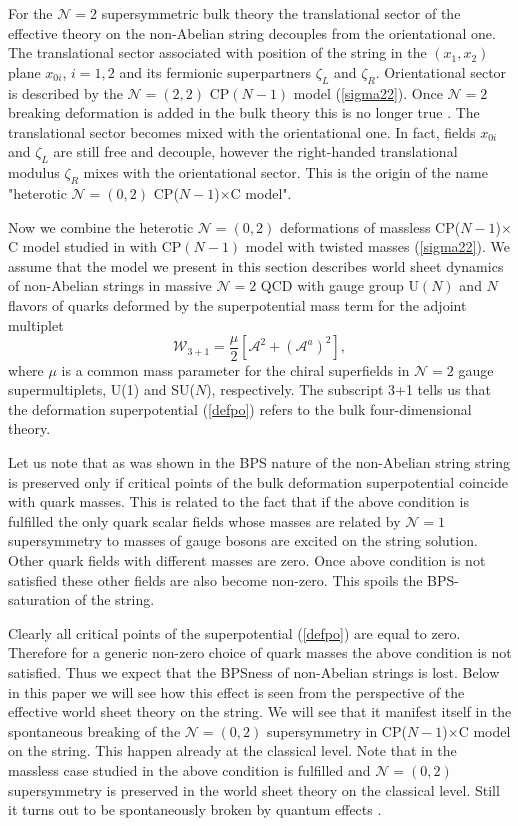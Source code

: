 \documentclass[12pt]{article}
\def\beq{\begin{equation}}
\def\eeq{\end{equation}}
\newcommand{\ntwo}{${\mathcal N}=2$ }
\newcommand{\ntwot}{${\mathcal N}= \left(2,2\right) $ }
\newcommand{\ntwoo}{${\mathcal N}= \left(0,2\right) $ }
\newcommand{\none}{${\mathcal N}=1$ }
\newcommand{\CPC}{CP($N-1$)$\times$C }
\begin{document}
For the \ntwo supersymmetric bulk theory the translational
sector of the effective theory on the non-Abelian string 
decouples from the orientational one. The translational sector
associated with position of the string in the $(x_1,x_2)$
plane $x_{0i}$, $i=1,2$ and its fermionic superpartners
$\zeta_L$ and $\zeta_R$. Orientational sector is described by the \ntwot CP$(N-1)$ model (\ref{sigma22}). Once \ntwo
breaking deformation is added in the bulk theory this is no longer true \cite{Edalati}. The translational sector becomes
mixed with the orientational one. In fact, fields $x_{0i}$ and 
$\zeta_L$ are still free and decouple, however the 
right-handed translational modulus $\zeta_R$ mixes with
the orientational sector. This is the origin of the name
"heterotic \ntwoo \CPC model".


Now we combine the heterotic \ntwoo deformations of massless
\CPC model studied in \cite{Edalati, SYhet,SYhetlN,BSYhet}
with CP$(N-1)$ model with twisted masses (\ref{sigma22}).
We assume that the model we present in this section 
describes world sheet dynamics of non-Abelian strings
in massive \ntwo QCD with gauge group U$(N)$ and $N$ flavors of quarks
deformed by the superpotential mass term for the adjoint multiplet
\beq
{\mathcal W}_{3+1}=\frac{\mu}{2} \left[{\mathcal A}^2
+  ({\mathcal A}^a)^2\right],
\label{defpo}
\eeq
where $\mu$ is a common mass parameter for the chiral
superfields in \ntwo gauge supermultiplets,
U(1) and SU($N$), respectively. The subscript 3+1 tells us that the deformation 
superpotential (\ref{defpo}) refers to the bulk four-dimensional theory.

Let us note that as was shown in \cite{Edalati,SYhet} 
 the BPS nature of the non-Abelian string string is preserved only
if critical points of the bulk deformation superpotential coincide with quark masses. This is related to the fact that
if the above condition is fulfilled the only  quark scalar fields whose masses are related by \none supersymmetry
to masses of gauge bosons are  excited on the string solution.
Other quark fields with different masses are zero. Once 
above condition is not satisfied these other fields are also
become non-zero. This spoils the BPS-saturation of the string.

Clearly all critical points of the superpotential (\ref{defpo})
are equal to zero. Therefore for a generic non-zero choice of
quark masses the above condition is not satisfied. Thus we expect
that the BPSness of non-Abelian strings is lost. Below in
this paper we will see how this effect is seen from the 
perspective of the effective world sheet theory on the string. We will
see that it manifest itself in the spontaneous breaking of 
the \ntwoo supersymmetry in \CPC model on the string. 
This happen already at the classical level. Note that in the massless case studied in \cite{SYhet,BSYhet} the above 
condition is fulfilled and \ntwoo supersymmetry is preserved
in the world sheet theory on the classical level. Still it turns
out to be spontaneously broken by quantum effects 
\cite{Tongd,SYhet,SYhetlN}.
\end{document}
